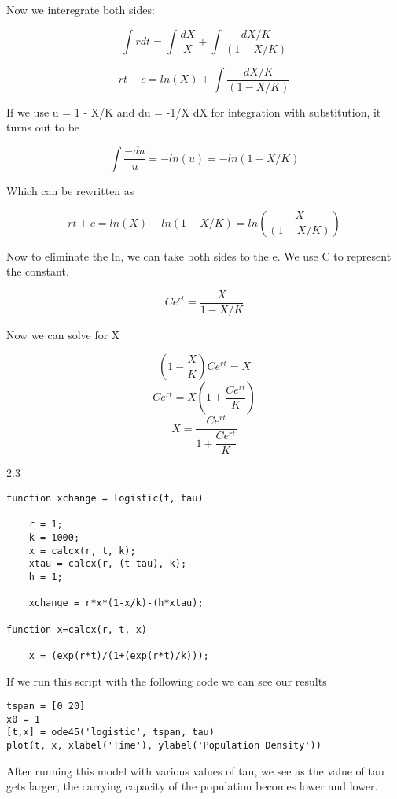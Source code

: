 \documentclass{article}
\begin{document}
Now we interegrate both sides:

\begin{equation}
    \int r dt = \int \dfrac{dX}{X} + \int \dfrac{dX/K}{(1-X/K)}
\end{equation}

\begin{equation}
    rt + c = ln(X) + \int \dfrac{dX/K}{(1-X/K)}
\end{equation}

If we use u = 1 - X/K and du = -1/X dX for integration with substitution, it turns out to be

\begin{equation}
    \int \dfrac{-du}{u} = -ln(u) = -ln(1-X/K)    
\end{equation}

Which can be rewritten as

\begin{equation}
    rt + c = ln(X) - ln(1-X/K) = ln(\dfrac{X}{(1-X/K)})
\end{equation}

Now to eliminate the ln, we can take both sides to the e. We use C to represent the constant.

\begin{equation}
    Ce^{rt} = \dfrac{X}{1-X/K}
\end{equation}

Now we can solve for X

\begin{equation}
    (1-\dfrac{X}{K})Ce^{rt} = X
\end{equation}
\begin{equation}
    Ce^{rt} = X(1+\dfrac{Ce^{rt}}{K})
\end{equation}
\begin{equation}
    X = \dfrac{Ce^{rt}}{1+\dfrac{Ce^{rt}}{K}} 
\end{equation}

2.3

\begin{lstlisting}
function xchange = logistic(t, tau)

    r = 1;
    k = 1000;
    x = calcx(r, t, k);
    xtau = calcx(r, (t-tau), k);
    h = 1;
    
    xchange = r*x*(1-x/k)-(h*xtau);

function x=calcx(r, t, x)

    x = (exp(r*t)/(1+(exp(r*t)/k)));
\end{lstlisting}

If we run this script with the following code we can see our results

\begin{lstlisting}
tspan = [0 20]
x0 = 1
[t,x] = ode45('logistic', tspan, tau)
plot(t, x, xlabel('Time'), ylabel('Population Density'))
\end{lstlisting}

After running this model with various values of tau, we see as the value of tau gets larger, the carrying capacity of the population becomes lower and lower.  
\end{document}
